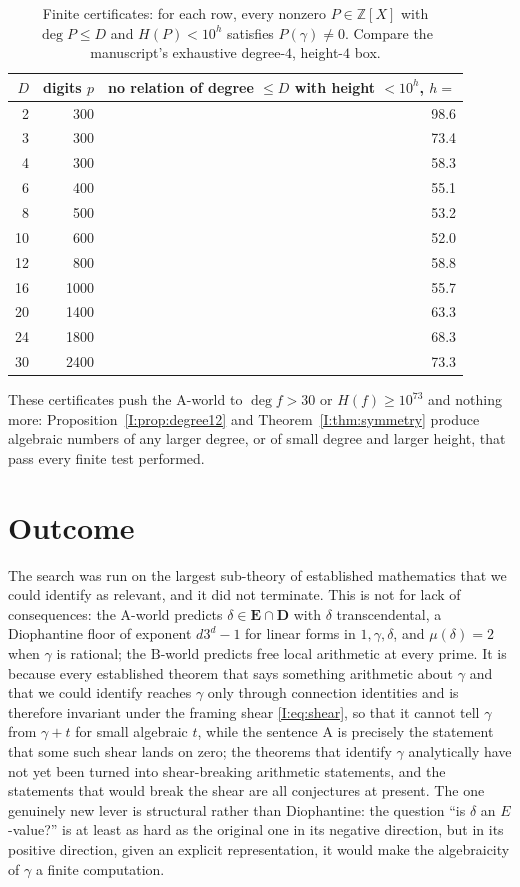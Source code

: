 \documentclass[11pt,a4paper]{article}
\newcommand{\Z}{\mathbb Z}
\newcommand{\EE}{\mathbf E}
\newcommand{\DD}{\mathbf D}
\theoremstyle{definition}
\theoremstyle{remark}
\numberwithin{equation}{section}
\begin{document}
\begin{table}[h]\centering\small
\begin{tabular}{@{}rrr@{}}
\toprule
$D$ & digits $p$ & no relation of degree $\le D$ with height $<10^{h}$, $h=$\\
\midrule
2 & 300 & 98.6\\
3 & 300 & 73.4\\
4 & 300 & 58.3\\
6 & 400 & 55.1\\
8 & 500 & 53.2\\
10 & 600 & 52.0\\
12 & 800 & 58.8\\
16 & 1000 & 55.7\\
20 & 1400 & 63.3\\
24 & 1800 & 68.3\\
30 & 2400 & 73.3\\
\bottomrule
\end{tabular}
\caption{Finite certificates: for each row, every nonzero $P\in\Z[X]$ with
$\deg P\le D$ and $H(P)<10^h$ satisfies $P(\gamma)\ne0$. Compare the manuscript's
exhaustive degree-$4$, height-$4$ box.}
\label{I:tab:lll}
\end{table}

These certificates push the $\mathrm A$-world to $\deg f>30$ or $H(f)\ge10^{73}$ and
nothing more: Proposition~\ref{I:prop:degree12} and Theorem~\ref{I:thm:symmetry} produce
algebraic numbers of any larger degree, or of small degree and larger height, that pass
every finite test performed.

\section{Outcome}\label{I:sec:outcome}

The search was run on the largest sub-theory of established mathematics that we could
identify as relevant, and it did not terminate. This is not for lack of consequences:
the $\mathrm A$-world predicts $\delta\in\EE\cap\DD$ with $\delta$ transcendental, a
Diophantine floor of exponent $d3^d-1$ for linear forms in $1,\gamma,\delta$, and
$\mu(\delta)=2$ when $\gamma$ is rational; the $\mathrm B$-world predicts free local
arithmetic at every prime. It is because every established theorem that says something
arithmetic about $\gamma$ and that we could identify reaches $\gamma$ only through
connection identities and is therefore invariant under the framing shear
\eqref{I:eq:shear}, so that it cannot tell $\gamma$ from $\gamma+t$ for small algebraic
$t$, while the sentence $\mathrm A$ is precisely the statement that some such shear lands
on zero; the theorems that identify $\gamma$
analytically have not yet been turned into shear-breaking arithmetic statements, and the
statements that would break the shear are all conjectures at present. The one genuinely new lever is structural rather than
Diophantine: the question ``is $\delta$ an $E$-value?'' is at least as hard as the original
one in its negative direction, but in its positive direction, given an explicit
representation, it would make the
algebraicity of $\gamma$ a finite computation.
\end{document}
